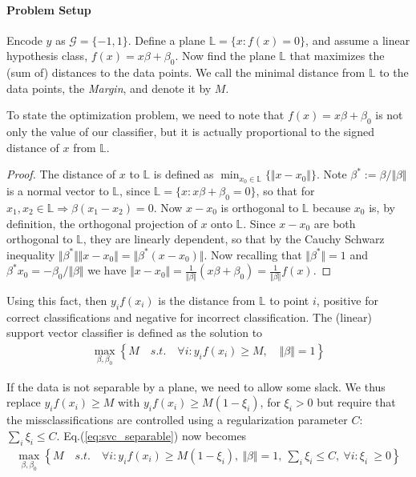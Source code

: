 \documentclass[12pt,a4paper]{article}
\theoremstyle{plain}
\theoremstyle{definition}
\newcommand{\norm}[1]{\Vert #1 \Vert}
\newcommand{\hyp}{f}
\newcommand{\plane}{\mathbb{L}}
\newcommand{\categories}{\mathcal{G}}
\begin{document}
\paragraph{Problem Setup}
Encode $y$ as $\categories=\{-1,1\}$.
Define a plane $\plane=\{x: \hyp(x)=0 \}$, and assume a linear hypothesis class, $\hyp(x)=x\beta+\beta_0$.
Now find the plane $\plane$ that maximizes the (sum of) distances to the data points.
We call the minimal distance from $\plane$ to the data points, the \emph{Margin}, and denote it by $M$.

To state the optimization problem, we need to note that $\hyp(x)=x\beta+\beta_0$ is not only the value of our classifier, but it is actually proportional to the signed distance of $x$ from $\plane$. 
\begin{proof}
The distance of $x$ to $\plane$ is defined as $\min_{x_0 \in \plane} \{ \norm{x-x_0} \}$.
Note $\beta^*:=\beta/\norm{\beta}$ is a normal vector to $\plane$, since $\plane=\{x: x\beta+\beta_0=0 \}$, so that for $x_1,x_2 \in \plane \Rightarrow \beta(x_1-x_2)=0$.
Now $x-x_0$ is orthogonal to $\plane$ because $x_0$ is, by definition, the orthogonal projection of $x$ onto $\plane$.
Since $x-x_0$ are both orthogonal to $\plane$, they are linearly dependent, so that by the Cauchy Schwarz inequality $\norm{\beta^*} \norm{x-x_0}= \norm{\beta^*(x-x_0)}$.
Now recalling that $\norm{\beta^*}=1$ and $\beta^* x_0=-\beta_0/\norm{\beta}$ we have $\norm{x-x_0}=\frac{1}{\norm{\beta}} (x\beta+\beta_0)= \frac{1}{\norm{\beta}} \hyp(x)$.
\end{proof}

Using this fact, then $y_i \hyp(x_i)$ is the distance from $\plane$ to point $i$, positive for correct classifications and negative for incorrect classification. 
The (linear) support vector classifier is defined as the solution to
\begin{align}
\label{eq:svc_separable}
	\max_{\beta,\beta_0} \left\{ 
		M \quad s.t. \quad 
		\forall i: y_i \hyp(x_i) \geq M, \quad \norm{\beta}=1
	\right\}
\end{align}

If the data is not separable by a plane, we need to allow some slack.
We thus replace $y_i \hyp(x_i) \geq M$ with $y_i \hyp(x_i) \geq M(1-\xi_i)$, for $\xi_i>0$ but require that the missclassifications are controlled using a regularization parameter $C$: $\sum_i \xi_i \leq C$.
Eq.(\ref{eq:svc_separable}) now becomes \citep[Eq.(12.25)]{hastie_elements_2003}
\begin{align}
\label{eq:svc_non_separable}
	\max_{\beta,\beta_0} \left\{ 
		M \quad s.t. \quad 
		\forall i: y_i \hyp(x_i) \geq M(1-\xi_i), 
		\: \norm{\beta}=1, 
		\: \sum_i \xi_i \leq C,
		\:\forall i:\xi_i\ \geq 0
	\right\}
\end{align}
\end{document}

